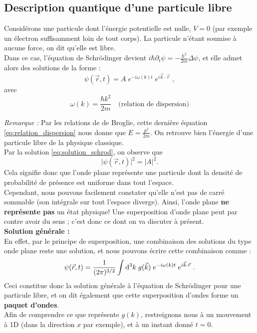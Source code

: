 \subsection{Description quantique d'une particule libre}
Considérons une particule dont l'énergie potentielle est nulle, $V=0$ (par exemple un électron suffisamment loin de tout corps). La particule n'étant soumise à aucune force, on dit qu'elle est libre.\\
Dans ce cas, l'équation de Schrödinger devient $i \hbar \partial_t \psi = -\frac{\hbar^2}{2m} \Delta \psi$, et elle admet alors des solutions de la forme : 
\begin{equation}\label{eq:solution_schrod}
\psi(\vec r, t) = A \; e^{-i\omega(k) t} \; e ^{i \vec k \cdot \vec r} \; ,
\end{equation}
avec 
\begin{equation}\label{eq:relation_dispersion}
\omega(k) = \dfrac{\hbar k^2}{2m} \quad \text{(relation de dispersion)}
\end{equation}

\textit{Remarque : } Par les relations de de Broglie, cette dernière équation \ref{eq:relation_dispersion} nous donne que $E = \frac{p^2}{2m}$. On retrouve bien l'énergie d'une particule libre de la physique classique. \\

Par la solution \ref{eq:solution_schrod}, on observe que $$ \lvert \psi(\vec{r},t) \rvert^2 = \lvert A \rvert^2 .$$
Cela signifie donc que l'onde plane représente une particule dont la densité de probabilité de présence est uniforme dans tout l'espace. \\
Cependant, nous pouvons facilement constater qu'elle n'est pas de carré sommable (son intégrale sur tout l'espace diverge). Ainsi, l'onde plane \textbf{ne représente pas} un état physique! Une superposition d'onde plane peut par contre avoir du sens ; c'est donc ce dont on va discuter à présent. \\

\textbf{Solution générale :} \\
En effet, par le principe de superposition, une combinaison des solutions du type onde plane reste une solution, et nous pouvons écrire cette combinaison comme : 
\begin{equation} \label{eq:schrod_sol_gen}
\psi(\vec r, t) = \dfrac{1}{(2\pi)^{3/2}} \int \mathrm{d} ^3 k \; g(\vec k) \; e^{-i\omega(k) t} \; e^{i\vec k \cdot \vec r} \; .
\end{equation}
Ceci constitue donc la solution générale à l'équation de Schrödinger pour une particule libre, et on dit également que cette superposition d'ondes forme un \textbf{paquet d'ondes}. \\
Afin de comprendre ce que représente $g(k)$, restreignons nous à un mouvement à 1D (dans la direction $x$ par exemple), et à un instant donné $t=0$.

